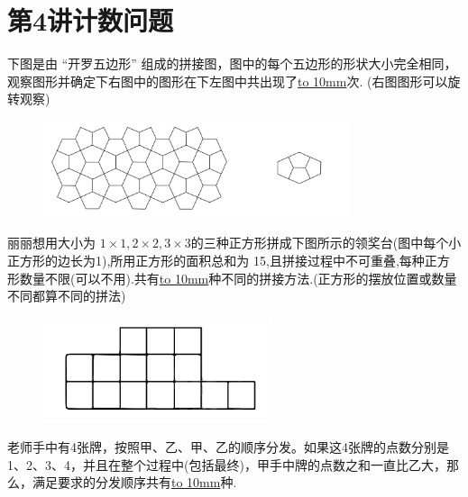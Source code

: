 \section{第4讲\quad 计数问题}

\item {
    下图是由 ``开罗五边形'' 组成的拼接图，图中的每个五边形的形状大小完全相同，观察图形并确定下右图中的图形在下左图中共出现了\underline{\hbox to 10mm{}}次. (右图图形可以旋转观察)
    \begin{figure}[H] 
        \centering
        \includegraphics[width=0.8\textwidth]{./pics/Chapter_6/8.png}
    \end{figure}
}

\item {丽丽想用大小为 $1\times 1, 2\times 2, 3\times 3$的三种正方形拼成下图所示的领奖台(图中每个小正方形的边长为1),所用正方形的面积总和为 15,且拼接过程中不可重叠,每种正方形数量不限(可以不用).共有\underline{\hbox to 10mm{}}种不同的拼接方法.(正方形的摆放位置或数量不同都算不同的拼法)
    \begin{figure}[H] 
        \centering
        \includegraphics[width=0.6\textwidth]{./pics/Chapter_6/9.png}
    \end{figure}
}

\item {老师手中有4张牌，按照甲、乙、甲、乙的顺序分发。如果这4张牌的点数分别是 1、2、3、4，并且在整个过程中(包括最终)，甲手中牌的点数之和一直比乙大，那么，满足要求的分发顺序共有\underline{\hbox to 10mm{}}种.
}

